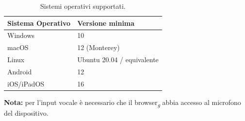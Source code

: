 \begin{table}[H]
    \centering
    \renewcommand{\arraystretch}{1.2}
    \begin{tabular}{ll}
        \toprule
        \textbf{Sistema Operativo} & \textbf{Versione minima} \\
        \midrule
        Windows    & 10 \\
        macOS      & 12 (Monterey) \\
        Linux      & Ubuntu 20.04 / equivalente \\
        Android    & 12 \\
        iOS/iPadOS & 16 \\
        \bottomrule
    \end{tabular}
    \caption{Sistemi operativi supportati.}
    \label{tab:req-os}
\end{table}

\textbf{Nota:} per l'input vocale \`e necessario che il browser\textsubscript{\textit{g}} abbia accesso al microfono del dispositivo.
